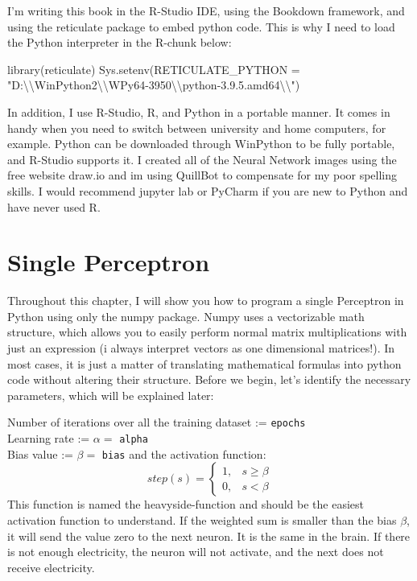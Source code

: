 \documentclass[
]{book}
\newenvironment{Shaded}{\begin{snugshade}}{\end{snugshade}}
\newcommand{\AttributeTok}[1]{\textcolor[rgb]{0.77,0.63,0.00}{#1}}
\newcommand{\FunctionTok}[1]{\textcolor[rgb]{0.00,0.00,0.00}{#1}}
\newcommand{\NormalTok}[1]{#1}
\newcommand{\SpecialCharTok}[1]{\textcolor[rgb]{0.00,0.00,0.00}{#1}}
\newcommand{\StringTok}[1]{\textcolor[rgb]{0.31,0.60,0.02}{#1}}
\begin{document}
I'm writing this book in the R-Studio IDE, using the Bookdown framework, and using the reticulate package to embed python code. This is why I need to load the Python interpreter in the R-chunk below:

\begin{Shaded}
\begin{Highlighting}[]
\FunctionTok{library}\NormalTok{(reticulate)}
\FunctionTok{Sys.setenv}\NormalTok{(}\AttributeTok{RETICULATE\_PYTHON =} \StringTok{"D:}\SpecialCharTok{\textbackslash{}\textbackslash{}}\StringTok{WinPython2}\SpecialCharTok{\textbackslash{}\textbackslash{}}\StringTok{WPy64{-}3950}\SpecialCharTok{\textbackslash{}\textbackslash{}}\StringTok{python{-}3.9.5.amd64}\SpecialCharTok{\textbackslash{}\textbackslash{}}\StringTok{"}\NormalTok{)}
\end{Highlighting}
\end{Shaded}

In addition, I use R-Studio, R, and Python in a portable manner. It comes in handy when you need to switch between university and home computers, for example. Python can be downloaded through WinPython to be fully portable, and R-Studio supports it. I created all of the Neural Network images using the free website draw.io and im using QuillBot to compensate for my poor spelling skills. I would recommend jupyter lab or PyCharm if you are new to Python and have never used R.

\hypertarget{single-perceptron}{%
\chapter{Single Perceptron}\label{single-perceptron}}

Throughout this chapter, I will show you how to program a single Perceptron in Python using only the numpy package. Numpy uses a vectorizable math structure, which allows you to easily perform normal matrix multiplications with just an expression (i always interpret vectors as one dimensional matrices!). In most cases, it is just a matter of translating mathematical formulas into python code without altering their structure. Before we begin, let's identify the necessary parameters, which will be explained later:

Number of iterations over all the training dataset := \texttt{epochs}\\
Learning rate := \(\alpha =\) \texttt{alpha}\\
Bias value := \(\beta =\) \texttt{bias}
and the activation function:\\
\[ 
step(s)= 
\begin{cases}
    1,& s   \geq \beta\\
    0,& s < \beta
\end{cases}
\]
This function is named the heavyside-function and should be the easiest activation function to understand. If the weighted sum is smaller than the bias \(\beta\), it will send the value zero to the next neuron. It is the same in the brain. If there is not enough electricity, the neuron will not activate, and the next does not receive electricity.
\end{document}
